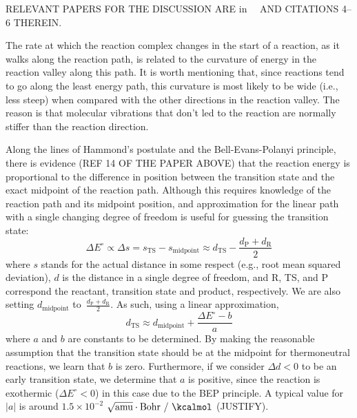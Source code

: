 RELEVANT PAPERS FOR THE DISCUSSION ARE in~\citeauthor{Cremer_2012}~\cite{Cremer_2012}
AND CITATIONS 4--6 THEREIN.\@

The rate at which the reaction complex changes in the start of a reaction, as
it walks along the reaction path, is related to the curvature of energy in the
reaction valley along this path.
It is worth mentioning that, since reactions tend to go along the least energy
path, this curvature is most likely to be wide (i.e., less steep) when compared
with the other directions in the reaction valley.
The reason is that molecular vibrations that don't led to the reaction are
normally stiffer than the reaction direction.

Along the lines of Hammond's postulate and the Bell-Evans-Polanyi principle,
there is evidence (REF 14 OF THE PAPER ABOVE) that the reaction energy is
proportional to the difference in position between the transition state and the
exact midpoint of the reaction path.
Although this requires knowledge of the reaction path and its midpoint
position, and approximation for the linear path with a single changing degree
of freedom is useful for guessing the transition state:
%
\begin{equation}
	\Delta E^\circ \propto \Delta s
	= s_\text{TS} - s_\text{midpoint}
	\approx d_\text{TS} - \frac{d_\text{P} + d_\text{R}}{2}
\end{equation}
%
where $s$ stands for the actual distance in some respect (e.g., root mean
squared deviation), $d$ is the distance in a single degree of freedom, and R,
TS, and P correspond the reactant, transition state and product, respectively.
We are also setting $d_\text{midpoint}$
to~$\frac{d_\text{P} + d_\text{R}}{2}$.
As such, using a linear approximation,
%
\begin{equation}
	d_\text{TS}
	\approx d_\text{midpoint} + \frac{\Delta E^\circ - b}{a}
\end{equation}
%
where $a$ and $b$ are constants to be determined.
By making the reasonable assumption that the transition state should be at the
midpoint for thermoneutral reactions, we learn that $b$ is zero.
Furthermore, if we consider $\Delta d < 0$ to be an early transition state, we
determine that $a$ is positive, since the reaction is exothermic
($\Delta E^\circ < 0$) in this case due to the BEP principle.
A typical value for $|a|$ is around
$1.5 \times 10^{-2}$
$\sqrt{\text{amu}}\cdot\text{Bohr}~/~\text{\kcalmol}$
(JUSTIFY).


